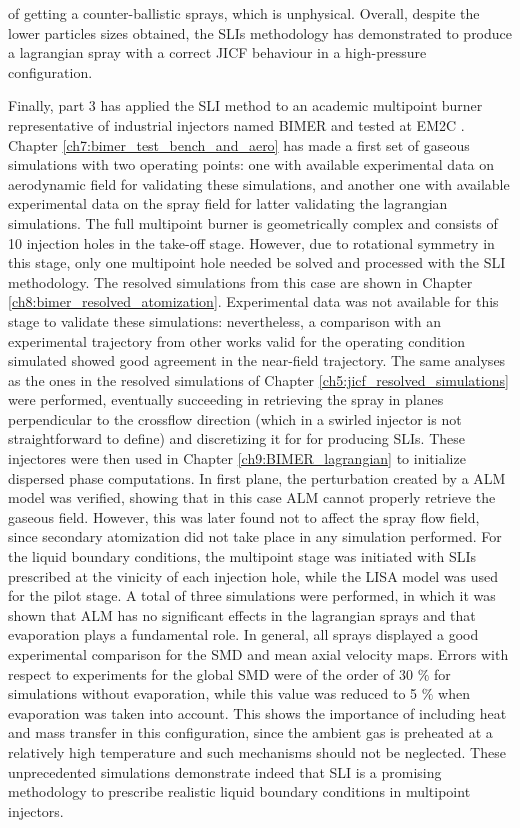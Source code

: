 of getting a counter-ballistic sprays, which is unphysical. Overall, despite the lower particles sizes obtained, the SLIs methodology has demonstrated to produce a lagrangian spray with a correct JICF behaviour in a high-pressure configuration.

\clearpage

Finally, part 3 has applied the SLI method to an academic multipoint burner representative of industrial injectors named BIMER and tested at EM2C . Chapter \ref{ch7:bimer_test_bench_and_aero} has made a first set of gaseous simulations with two operating points: one with available experimental data on aerodynamic field for validating these simulations, and another one with available experimental data on the spray field for latter validating the lagrangian simulations. The full multipoint burner is geometrically complex and consists of 10 injection holes in the take-off stage. However, due to rotational symmetry in this stage, only one multipoint hole needed be solved and processed with the SLI methodology. The resolved simulations from this case are shown in Chapter \ref{ch8:bimer_resolved_atomization}. Experimental data was not available for this stage to validate these simulations: nevertheless, a comparison with an experimental trajectory from other works valid for the operating condition simulated showed good agreement in the near-field trajectory. The same analyses as the ones in the resolved simulations of Chapter \ref{ch5:jicf_resolved_simulations} were performed, eventually succeeding in retrieving the spray in planes perpendicular to the crossflow direction (which in a swirled injector is not straightforward to define) and discretizing it for for producing SLIs. These injectores were then used in Chapter \ref{ch9:BIMER_lagrangian} to initialize dispersed phase computations. In first plane, the perturbation created by a ALM model was verified, showing that in this case ALM cannot properly retrieve the gaseous field. However, this was later found not to affect the spray flow field, since secondary atomization did not take place in any simulation performed. For the liquid boundary conditions, the multipoint stage was initiated with SLIs prescribed at the vinicity of each injection hole, while the LISA model was used for the pilot stage. A total of three simulations were performed, in which it was shown that ALM has no significant effects in the lagrangian sprays and that evaporation plays a fundamental role. In general, all sprays displayed a good experimental comparison for the SMD and mean axial velocity maps. Errors with respect to experiments for the global SMD were of the order of 30 $\%$ for simulations without evaporation, while this value was reduced to 5 $\%$ when evaporation was taken into account. This shows the importance of including heat and mass transfer in this configuration, since the ambient gas is preheated at a relatively high temperature and such mechanisms should not be neglected. These unprecedented simulations demonstrate indeed that SLI is a promising methodology to prescribe realistic liquid boundary conditions in multipoint injectors.

